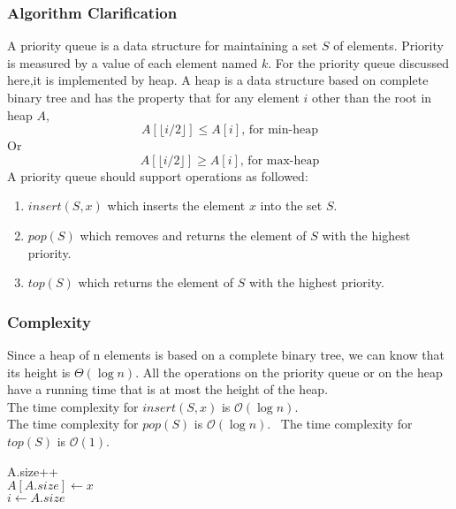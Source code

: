 \documentclass[catalog.tex]{subfiles}
\begin{document}
\subsubsection{Algorithm Clarification}
A priority queue is a data structure for maintaining a set $S$ of elements. Priority is measured by a value of each element named $k$. For the priority queue discussed here,it is implemented by heap. A heap is a data structure based on complete binary tree and has the property that for any element $i$ other than the root in heap $A$,
$$
	A[\lfloor i/2 \rfloor] \leq A[i] \text{, for min-heap}
$$
Or
$$
	A[\lfloor i/2 \rfloor] \geq A[i] \text{, for max-heap}
$$
A priority queue should support operations as followed: ~\cite{intro3rd}
\begin{enumerate}
	\item $insert(S,x)$ which inserts the element $x$ into the set $S$.
	\item $pop(S)$ which removes and returns the element of $S$ with the highest priority.
	\item $top(S)$ which returns the element of $S$ with the highest priority.
\end{enumerate}
\newpage
\subsubsection{Complexity}
Since a heap of n elements is based on a complete binary tree, we can know that its height is $\Theta(\log n)$. All the operations on the priority queue or on the heap have a running time that is at most the height of the heap. \\
The time complexity for $insert(S,x)$ is $\mathcal{O}(\log n)$. \\
The time complexity for $pop(S)$ is $\mathcal{O}(\log n)$.~\cite{ve477}
The time complexity for $top(S)$ is $\mathcal{O}(1)$. \\



\begin{Algorithm}[$insert(S,x)$\label{alg:\currfilebase_b}]
	\BlankLine
	A.size++ \\
	$A[A.size] \gets x$ \\
	$i \gets A.size$ \\
	\Ret

\end{Algorithm}
\end{document}
